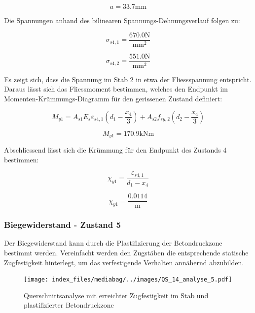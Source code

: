 \documentclass[
  12pt,
  letterpaper,
  egregdoesnotlikesansseriftitles]{scrreprt}
\begin{document}
\begin{equation}a = 33.7 \text{mm}\end{equation}

Die Spannungen anhand des bilinearen Spannungs-Dehnungsverlauf folgen
zu:

\begin{equation}\sigma_{s 4,1} = \frac{670.0 \text{N}}{\text{mm}^{2}}\end{equation}

\begin{equation}\sigma_{s 4,2} = \frac{551.0 \text{N}}{\text{mm}^{2}}\end{equation}

Es zeigt sich, dass die Spannung im Stab 2 in etwa der Fliessspannung
entspricht. Daraus lässt sich das Fliessmoment bestimmen, welches den
Endpunkt im Momenten-Krümmungs-Diagramm für den gerissenen Zustand
definiert:

\begin{equation}M_{y 1} = A_{s 1} E_{s} \varepsilon_{s4,1} \left(d_{1} - \frac{x_{4}}{3}\right) + A_{s 2} f_{sy,2} \left(d_{2} - \frac{x_{4}}{3}\right)\end{equation}

\begin{equation}M_{y 1} = 170.9 \text{kN} \text{m}\end{equation}

Abschliessend lässt sich die Krümmung für den Endpunkt des Zustands 4
bestimmen:

\begin{equation}\chi_{y1} = \frac{\varepsilon_{s4,1}}{d_{1} - x_{4}}\end{equation}

\begin{equation}\chi_{y1} = \frac{0.0114}{\text{m}}\end{equation}

\hypertarget{biegewiderstand---zustand-5}{%
\subsubsection{Biegewiderstand - Zustand
5}\label{biegewiderstand---zustand-5}}

Der Biegewiderstand kann durch die Plastifizierung der Betondruckzone
bestimmt werden. Vereinfacht werden den Zugstäben die entsprechende
statische Zugfestigkeit hinterlegt, um das verfestigende Verhalten
annähernd abzubilden.

\begin{figure}[H]

{\centering \texttt{[image: index\_files/mediabag/../images/QS\_14\_analyse\_5.pdf]}

}

\caption{\label{fig-qs6_sv14}Querschnittsanalyse mit erreichter
Zugfestigkeit im Stab und plastifizierter Betondruckzone}

\end{figure}
\end{document}
